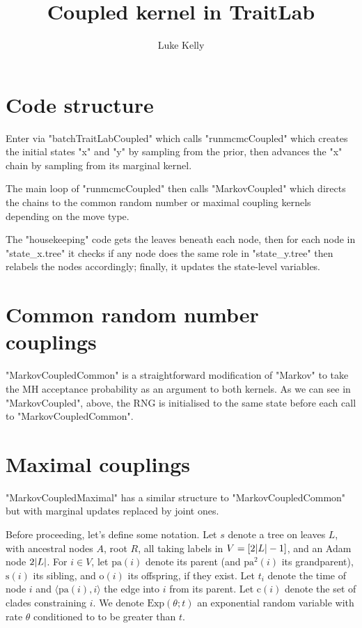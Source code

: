 \documentclass[11pt,a4paper]{article}
\title{\vspace{-2.5cm} Coupled kernel in TraitLab}
\author{Luke Kelly}
\newcommand{\edge}[2]{\langle#1, #2\rangle}
\newcommand{\pa}{\mathrm{pa}}
\newcommand{\sib}{\mathrm{s}}
\newcommand{\off}{\mathrm{o}}
\newcommand{\cla}{\mathrm{c}}
\newcommand{\Exp}[1]{\mathrm{Exp}(#1)}
\DeclarePairedDelimiter\abs{\lvert}{\rvert}%
\begin{document}
\maketitle

\section*{Code structure}

Enter via "batchTraitLabCoupled" which calls "runmcmcCoupled" which creates the initial states "x" and "y" by sampling from the prior, then advances the "x" chain by sampling from its marginal kernel.



The main loop of "runmcmcCoupled" then calls "MarkovCoupled" which directs the chains to the common random number or maximal coupling kernels depending on the move type.



The "housekeeping" code gets the leaves beneath each node, then for each node in "state_x.tree" it checks if any node does the same role in "state_y.tree" then relabels the nodes accordingly; finally, it updates the state-level variables.

\section*{Common random number couplings}

"MarkovCoupledCommon" is a straightforward modification of "Markov" to take the MH acceptance probability as an argument to both kernels. As we can see in "MarkovCoupled", above, the RNG is initialised to the same state before each call to "MarkovCoupledCommon".

\section*{Maximal couplings}

"MarkovCoupledMaximal" has a similar structure to "MarkovCoupledCommon" but with marginal updates replaced by joint ones.

Before proceeding, let's define some notation. Let $ s $ denote a tree on leaves $ L $, with ancestral nodes $ A $, root $ R $, all taking labels in $ V = [2 \abs{L} - 1] $, and an Adam node $ 2 \abs{L} $. For $ i \in V $, let $ \pa(i) $ denote its parent (and $ \pa^2(i) $ its grandparent), $ \sib(i) $ its sibling, and $ \off(i) $ its offspring, if they exist. Let $ t_i $ denote the time of node $ i $ and $ \edge{\pa(i)}{i} $ the edge into $ i $ from its parent. Let $ \cla(i) $ denote the set of clades constraining $ i $. We denote $ \Exp{\theta; t} $ an exponential random variable with rate $ \theta $ conditioned to to be greater than $ t $.
\end{document}
